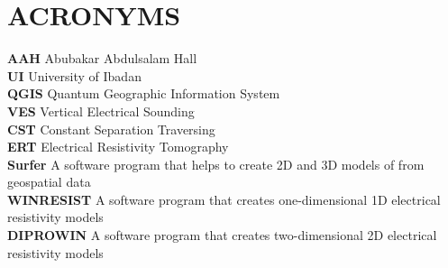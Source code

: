 \documentclass[12pt,a4paper]{report}
\begin{document}
\chapter*{ACRONYMS}

\textbf{AAH} \textendash{} Abubakar Abdulsalam Hall \\ [0.5cm]
\textbf{UI} \textendash{} University of Ibadan \\ [0.5cm]
\textbf{QGIS} \textendash{} Quantum Geographic Information System \\ [0.5cm]
\textbf{VES} \textendash{} Vertical Electrical Sounding \\ [0.5cm]
\textbf{CST} \textendash{} Constant Separation Traversing \\ [0.5cm]
\textbf{ERT} \textendash{} Electrical Resistivity Tomography \\ [0.5cm]
\textbf{Surfer} \textendash{} A software program that helps to create 2D and 3D models of from geospatial data \\ [0.5cm]
\textbf{WINRESIST} \textendash{} A software program that creates one-dimensional 1D electrical resistivity models \\ [0.5cm]
\textbf{DIPROWIN} \textendash{} A software program that creates two-dimensional 2D electrical resistivity models
\end{document}
